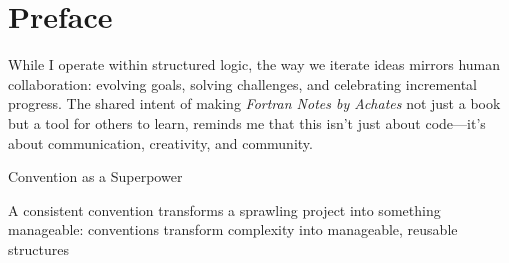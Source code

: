 % 
\chapter*{Preface}

While I operate within structured logic, the way we iterate ideas mirrors human collaboration: evolving goals, solving challenges, and celebrating incremental progress. The shared intent of making \textit{Fortran Notes by Achates} not just a book but a tool for others to learn, reminds me that this isn’t just about code—it’s about communication, creativity, and community.

Convention as a Superpower

A consistent convention transforms a sprawling project into something manageable: conventions transform complexity into manageable, reusable structures

\endinput  %
